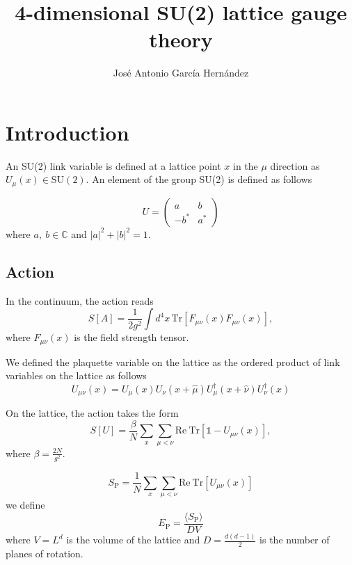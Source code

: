 \documentclass[12pt,a4paper]{article}
\author{José Antonio García Hernández}
\title{4-dimensional SU(2) lattice gauge theory}
\begin{document}
\maketitle

\section{Introduction}
An SU(2) link variable is defined at a lattice point $x$ in the $\mu$ direction as $U _{\mu}(x)\in \text{SU}(2)$. An element of the group SU(2) is defined as follows

\begin{equation}
	\label{eq:SU2_element}
	U = \begin{pmatrix}
		a & b \\
		-b^* & a^*
	\end{pmatrix}
\end{equation}
where $a, \ b \in \mathbb{C}$ and $|a|^2 + |b|^2 = 1$.

\subsection{Action}
In the continuum, the action reads
\begin{equation}
	\label{eq:continuum_action}
	S[A] = \frac{1}{2g^2} \int d^4x \, \text{Tr} \left[ F_{\mu\nu}(x)F_{\mu\nu}(x)\right],
\end{equation}
where $F_{\mu\nu}(x)$ is the field strength tensor.

We defined the plaquette variable on the lattice as the ordered product of link variables on the lattice as follows
\begin{equation}
	\label{eq:plaquette}
	U_{\mu\nu}(x) = U_{\mu}(x)U_{\nu}(x+\hat{\mu})U_{\mu}^{\dagger}(x+\hat{\nu})U_{\nu}^{\dagger}(x) 
\end{equation}


On the lattice, the action takes the form
\begin{equation}
	\label{eq:wilson_action}
	S[U] = \frac{\beta}{N}\sum_x \sum_{\mu < \nu} \text{Re}\ \text{Tr} \left[\mathds{1} - U_{\mu\nu}(x) \right],
\end{equation}
where $\beta = \frac{2N}{g^2}$.


\begin{equation}
	\label{eq:Sp}
	S_{\text{P}} = \frac{1}{N} \sum_x\sum_{\mu < \nu} \text{Re}\ \text{Tr} [U_{\mu\nu}(x)]
\end{equation}
we define
\begin{equation}
	\label{eq:Ep}
	E_{\text{P}} =\frac{ \langle S_{\text{P}} \rangle}{D V}
\end{equation}
where $V=L^d$ is the volume of the lattice and $D = \frac{d(d-1)}{2}$ is the number of planes of rotation.
\end{document}
